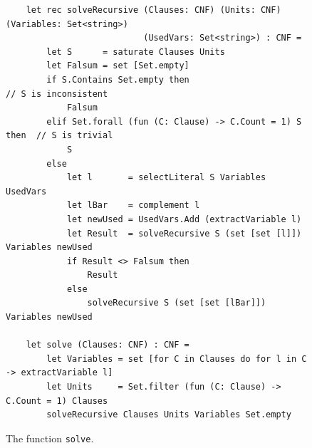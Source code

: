 \begin{figure}[!ht]
  \centering
\begin{verbatim}
    let rec solveRecursive (Clauses: CNF) (Units: CNF) (Variables: Set<string>)
                           (UsedVars: Set<string>) : CNF =
        let S      = saturate Clauses Units
        let Falsum = set [Set.empty]
        if S.Contains Set.empty then                             // S is inconsistent
            Falsum
        elif Set.forall (fun (C: Clause) -> C.Count = 1) S then  // S is trivial
            S
        else
            let l       = selectLiteral S Variables UsedVars
            let lBar    = complement l
            let newUsed = UsedVars.Add (extractVariable l)
            let Result  = solveRecursive S (set [set [l]]) Variables newUsed
            if Result <> Falsum then
                Result
            else
                solveRecursive S (set [set [lBar]]) Variables newUsed

    let solve (Clauses: CNF) : CNF =
        let Variables = set [for C in Clauses do for l in C -> extractVariable l]
        let Units     = Set.filter (fun (C: Clause) -> C.Count = 1) Clauses
        solveRecursive Clauses Units Variables Set.empty
\end{verbatim}
\vspace*{-0.3cm}
  \caption{The function \texttt{solve}.}
  \label{fig:solve}
\end{figure} 
